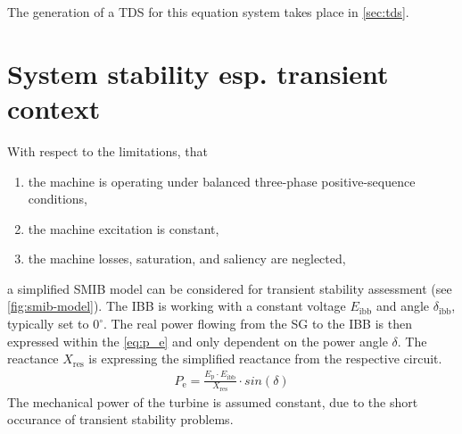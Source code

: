 The generation of a \ac{TDS} for this equation system takes place in \autoref{sec:tds}.

\section{System stability esp. transient context}

With respect to the limitations, that
\begin{enumerate}
        \item the machine is operating under balanced three-phase positive-sequence conditions,
        \item the machine excitation is constant,
        \item the machine losses, saturation, and saliency are neglected,
\end{enumerate}
a simplified \acf{SMIB} model can be considered for transient stability assessment (see \autoref{fig:smib-model}).  The \ac{IBB} is working with a constant voltage $E_\mathrm{ibb}$ and angle $\delta_\mathrm{ibb}$, typically set to $0^\circ$. The real power flowing from the \ac{SG} to the \ac{IBB} is then expressed within the \autoref{eq:p_e} and only dependent on the power angle $\delta$. The reactance $X_\mathrm{res}$ is expressing the simplified reactance from the respective circuit.
\begin{align}
        P_\mathrm{e}=\frac{E_\mathrm{p} \cdot E_\mathrm{ibb}}{X_\mathrm{res}} \cdot sin(\delta) \label{eq:p_e}
\end{align}
The mechanical power of the turbine is assumed constant, due to the short occurance of transient stability problems.


